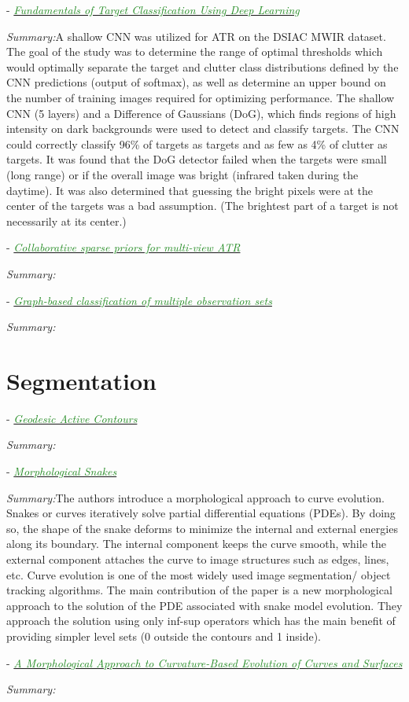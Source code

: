 \documentclass[]{article}
\newcommand{\paperentry}[4]{
            \hangindent=1cm
            \textcolor{red}{\cite{#1}} - \href{run:../References/#3}{\textcolor{ForestGreen}{\textit{#2}}}
            
            \noindent            
            \begin{minipage}[t]{0.1\linewidth}\hfill\end{minipage}
            \begin{minipage}[t]{0.8\linewidth}\textcolor{NavyBlue}{{\textit{Summary:}}}#4\end{minipage}
            \vspace{.25cm}
          }
\begin{document}
\paperentry{Tanner2019DSIACNeuralNet}
{Fundamentals of Target Classification Using Deep Learning}
{Army/Tanner2019DSIACNeuralNet.pdf}
{A shallow CNN was utilized for ATR on the DSIAC MWIR dataset.  The goal of the study was to determine the range of optimal thresholds which would optimally separate the target and clutter class distributions defined by the CNN predictions (output of softmax), as well as determine an upper bound on the number of training images required for optimizing performance.  The shallow CNN (5 layers) and a Difference of Gaussians (DoG), which finds regions of high intensity on dark backgrounds were used to detect and classify targets.  The CNN could correctly classify 96\% of targets as targets and as few as 4\% of clutter as targets.  It was found that the DoG detector failed when the targets were small (long range) or if the overall image was bright (infrared taken during the daytime).  It was also determined that guessing the bright pixels were at the center of the targets was a bad assumption. (The brightest part of a target is not necessarily at its center.)}

\paperentry{Li2018CollaborativeSparsePriorsMultiViewATR}
{Collaborative sparse priors for multi-view ATR}
{Army/Li2018CollaborativeSparsePriorsMultiViewATR.pdf}
{}

\paperentry{Kokiopoulou2009GraphBasedClassificationMultipleObsSets}
{Graph-based classification of multiple observation sets}
{Army/Kokiopoulou2009GraphBasedClassificationMultipleObsSets.pdf}
{}


\section{Segmentation}
	\paperentry{Caselles1997GeodesicActiveContours}
	{Geodesic Active Contours}
	{Segmentation/Caselles1997GeodesicActiveContours.pdf}
	{}
	
	\paperentry{Alvarez2010MorphologicalSnakes}
	{Morphological Snakes}
	{Segmentation/Alvarez2010MorphologicalSnakes.pdf}
	{The authors introduce a morphological approach to curve evolution.  Snakes or curves iteratively solve partial differential equations (PDEs).  By doing so, the shape of the snake deforms to minimize the internal and external energies along its boundary.  The internal component keeps the curve smooth, while the external component attaches the curve to image structures such as edges, lines, etc.  Curve evolution is one of the most widely used image segmentation/ object tracking algorithms.  The main contribution of the paper is a new morphological approach to the solution of the PDE associated with snake model evolution.  They approach the solution using only inf-sup operators which has the main benefit of providing simpler level sets (0 outside the contours and 1 inside).}
	
	\paperentry{Marquez_Neila2014MorphologicalCurveBasedEvolution}
	{A Morphological Approach to Curvature-Based Evolution of Curves and Surfaces}
	{Segmentation/Marquez_Neila2014MorphologicalCurveBasedEvolution.pdf}
	{}

\newpage



\end{document}
